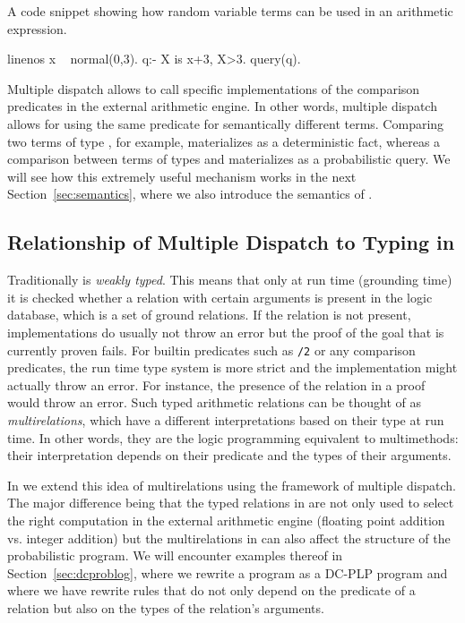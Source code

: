\begin{example} A \dcproblogsty code snippet showing how random variable terms can be used in an arithmetic expression. 
	\begin{problog*}{linenos}
x ~ normal(0,3).
q:- X is x+3, X>3.
query(q).
	\end{problog*}
\end{example}

Multiple dispatch allows \dcproblogsty to call specific implementations of the comparison predicates in the external arithmetic engine.
In other words, multiple dispatch allows for using the same predicate for semantically different terms.
Comparing two terms of type , for example, materializes as a deterministic fact, whereas a comparison between terms of types  and  materializes as a probabilistic query. We will see how this extremely useful mechanism works in the next Section~\ref{sec:semantics}, where we also introduce the semantics of \dcproblogsty.




\subsection{Relationship of Multiple Dispatch to Typing in \prologsty}

Traditionally \prologsty is {\em weakly typed}. This means that only at run time (grounding time) it is checked whether a relation with certain arguments is present in the logic database, which is a set of ground relations. If the relation is not present, \prologsty implementations do usually not throw an error but the proof of the goal that is currently proven fails. For builtin predicates such as \lstinline[columns=fixed]|/2| or any comparison predicates, the run time type system is more strict and the \prologsty implementation might actually throw an error. For instance, the presence of the relation  in a proof would throw an error.
Such typed arithmetic relations can be thought of as {\em multirelations}, which have a different interpretations based on their type at run time. In other words, they are the logic programming equivalent to multimethods: their interpretation depends on their predicate and the types of their arguments. 

In \dcproblogsty we extend this idea of multirelations using the framework of multiple dispatch. The major difference being that the typed relations in \dcproblogsty are not only used to select the right computation in the external arithmetic engine (\eg floating point addition vs. integer addition) but the multirelations in \dcproblogsty can also affect the structure of the probabilistic program. We will encounter examples thereof in Section~\ref{sec:dcproblog}, where we rewrite a \dcproblogsty program as a DC-PLP program and where we have rewrite rules that do not only depend on the predicate of a relation but also on the types of the relation's arguments.

